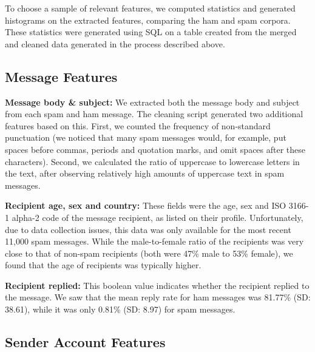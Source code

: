 \documentclass[preprint]{acm_proc_article-sp}
\begin{document}
To choose a sample of relevant features, we computed statistics and generated histograms on 
the extracted features, comparing the ham and spam corpora. These statistics were generated 
using SQL on a table created from the merged and cleaned data generated in the process described above.

\subsection{Message Features}

\textbf{Message body \& subject:} We extracted both the message body and subject from 
each spam and ham message. The cleaning script generated two additional features based 
on this. First, we counted the frequency of non-standard punctuation (we noticed that many 
spam messages would, for example, put spaces before commas, periods and quotation marks, 
and omit spaces after these characters). Second, we calculated the ratio of uppercase to 
lowercase letters in the text, after observing relatively high amounts of uppercase text in spam messages.

\textbf{Recipient age, sex and country:} These fields were the age, sex and ISO 3166-1 alpha-2 code of the message 
recipient, as listed on their profile. Unfortunately, due to data collection issues, this data was only available 
for the most recent 11,000 spam messages. While the male-to-female ratio of the recipients was very close to that 
of non-spam recipients (both were 47\% male to 53\% female), we found that the age of recipients was typically higher.

\textbf{Recipient replied:} This boolean value indicates whether the recipient replied to the message. We saw 
that the mean reply rate for ham messages was 81.77\% (SD: 38.61), while it was only 0.81\% (SD: 8.97) for spam messages. 

\subsection{Sender Account Features}
\end{document}
